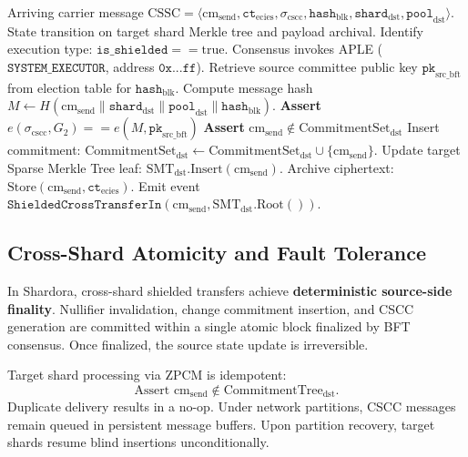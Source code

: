 \documentclass[journal,10pt,twocolumn]{IEEEtran}
\theoremstyle{definition}
\theoremstyle{remark}
\begin{document}
\begin{algorithm}[h]
\caption{Target Shard ZPCM Autonomous Execution (APLE)}
\label{alg:target_zpcm}
\begin{algorithmic}[1]
\REQUIRE Arriving carrier message $\text{CSSC} = \langle \text{cm}_{\text{send}}, \mathtt{ct}_{\text{ecies}}, \sigma_{\text{cscc}}, \mathtt{hash}_{\text{blk}}, \mathtt{shard}_{\text{dst}}, \mathtt{pool}_{\text{dst}} \rangle$.
\ENSURE State transition on target shard Merkle tree and payload archival.
\STATE Identify execution type: $\mathtt{is\_shielded} == \text{true}$.
\STATE Consensus invokes APLE ($\mathtt{SYSTEM\_EXECUTOR}$, address $\mathtt{0x...ff}$).
\STATE Retrieve source committee public key $\mathtt{pk}_{\text{src\_bft}}$ from election table for $\mathtt{hash}_{\text{blk}}$.
\STATE Compute message hash $M \leftarrow H(\text{cm}_{\text{send}} \parallel \mathtt{shard}_{\text{dst}} \parallel \mathtt{pool}_{\text{dst}} \parallel \mathtt{hash}_{\text{blk}})$.
\STATE \textbf{Assert} $e(\sigma_{\text{cscc}}, G_2) == e(M, \mathtt{pk}_{\text{src\_bft}})$ 
\STATE \textbf{Assert} $\text{cm}_{\text{send}} \notin \text{CommitmentSet}_{\text{dst}}$ 
\STATE Insert commitment: $\text{CommitmentSet}_{\text{dst}} \leftarrow \text{CommitmentSet}_{\text{dst}} \cup \{\text{cm}_{\text{send}}\}$.
\STATE Update target Sparse Merkle Tree leaf: $\text{SMT}_{\text{dst}}.\text{Insert}(\text{cm}_{\text{send}})$.
\STATE Archive ciphertext: $\text{Store}(\text{cm}_{\text{send}}, \mathtt{ct}_{\text{ecies}})$.
\STATE Emit event $\mathtt{ShieldedCrossTransferIn}(\text{cm}_{\text{send}}, \text{SMT}_{\text{dst}}.\text{Root}())$.
\end{algorithmic}
\end{algorithm}

\subsection{Cross-Shard Atomicity and Fault Tolerance}
In Shardora, cross-shard shielded transfers achieve \textbf{deterministic source-side finality}. Nullifier invalidation, change commitment insertion, and CSCC generation are committed within a single atomic block finalized by BFT consensus. Once finalized, the source state update is irreversible.

Target shard processing via ZPCM is idempotent:
\begin{equation}
\text{Assert } \text{cm}_{\text{send}} \notin \text{CommitmentTree}_{\text{dst}}.
\end{equation}
Duplicate delivery results in a no-op. Under network partitions, CSCC messages remain queued in persistent message buffers. Upon partition recovery, target shards resume blind insertions unconditionally.
\end{document}
